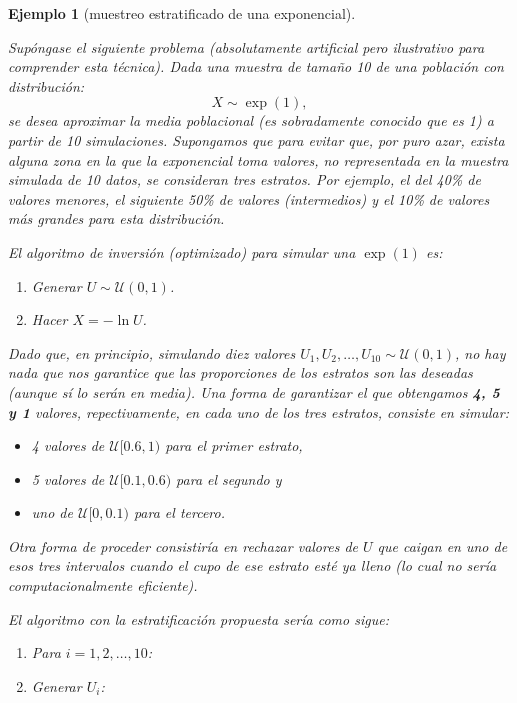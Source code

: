\documentclass[
]{book}
\theoremstyle{break}
\newtheorem{example}{Ejemplo}[chapter]
\theoremstyle{nonumberplain}
\begin{document}
\begin{example}[muestreo estratificado de una exponencial]
\protect\hypertarget{exm:estr-exp}{}\label{exm:estr-exp}

Supóngase el siguiente problema (absolutamente artificial pero ilustrativo para comprender esta técnica).
Dada una muestra de tamaño 10 de una población con distribución:
\[X \sim \exp\left( 1 \right),\]
se desea aproximar la media poblacional (es sobradamente conocido que es 1) a partir de 10 simulaciones.
Supongamos que para evitar que, por puro azar, exista alguna zona en la que la exponencial toma valores, no representada en la muestra simulada de 10 datos, se consideran tres estratos.
Por ejemplo, el del 40\% de valores menores, el siguiente 50\% de valores (intermedios) y el 10\% de valores más grandes para esta distribución.

El algoritmo de inversión (optimizado) para simular una \(\exp\left(1\right)\) es:

\begin{enumerate}
\def\labelenumi{\arabic{enumi}.}
\item
  Generar \(U\sim \mathcal{U}\left( 0,1\right)\).
\item
  Hacer \(X=-\ln U\).
\end{enumerate}

Dado que, en principio, simulando diez valores \(U_{1},U_{2},\ldots,U_{10}\sim \mathcal{U}\left( 0,1\right)\), no hay nada que nos garantice que las proporciones de los estratos son las deseadas (aunque sí lo serán en media).
Una forma de garantizar el que obtengamos \textbf{4, 5 y 1} valores, repectivamente, en cada uno de los tres estratos, consiste en simular:

\begin{itemize}
\item
  4 valores de \(\mathcal{U}[0.6,1)\) para el primer estrato,
\item
  5 valores de \(\mathcal{U}[0.1,0.6)\) para el segundo y
\item
  uno de \(\mathcal{U}[0,0.1)\) para el tercero.
\end{itemize}

Otra forma de proceder consistiría en rechazar valores de \(U\) que caigan en uno de esos tres intervalos cuando el cupo de ese estrato esté ya lleno (lo cual no sería computacionalmente eficiente).

El algoritmo con la estratificación propuesta sería como sigue:

\begin{enumerate}
\def\labelenumi{\arabic{enumi}.}
\item
  Para \(i=1,2,\ldots, 10\):
\item
  Generar \(U_{i}\):


\end{enumerate}
\end{example}
\end{document}
